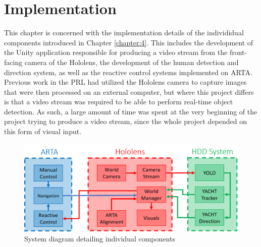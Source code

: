 \chapter{Implementation}
This chapter is concerned with the implementation details of the individidual components introduced in Chapter \ref{chapter:4}. This includes the development of the Unity application responsible for producing a video stream from the front-facing camera of the Hololens, the development of the human detection and direction system, as well as the reactive control systems implemented on ARTA. Previous work in the PRL had utilized the Hololens camera to capture images that were then processed on an external computer, but where this project differs is that a video stream was required to be able to perform real-time object detection. As such, a large amount of time was spent at the very beginning of the project trying to produce a video stream, since the whole project depended on this form of visual input.

\begin{figure}[ht]
	\centering
	\includegraphics[width=1.0\linewidth]{img/chapter5_implementation/detailedSystemDiagram.png}
	\caption{System diagram detailing individual components}
	\label{fig:detailedHL}
\end{figure}